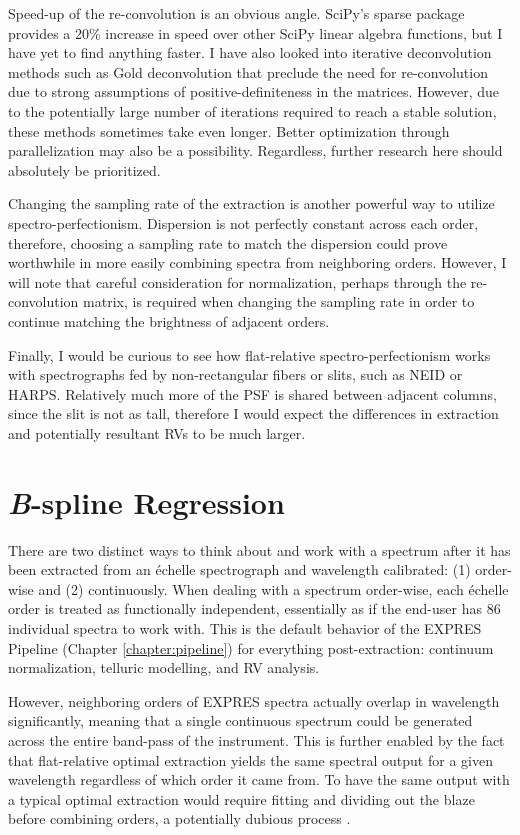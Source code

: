 Speed-up of the re-convolution is an obvious angle. SciPy's sparse package provides a 20\% increase in speed over other SciPy linear algebra functions, but I have yet to find anything faster. I have also looked into iterative deconvolution methods such as Gold deconvolution \citep{morhac_efficient_2003, morhac_deconvolution_2006} that preclude the need for re-convolution due to strong assumptions of positive-definiteness in the matrices. However, due to the potentially large number of iterations required to reach a stable solution, these methods sometimes take even longer. Better optimization through parallelization may also be a possibility. Regardless, further research here should absolutely be prioritized.

Changing the sampling rate of the extraction is another powerful way to utilize spectro-perfectionism. Dispersion is not perfectly constant across each order, therefore, choosing a sampling rate to match the dispersion could prove worthwhile in more easily combining spectra from neighboring orders. However, I will note that careful consideration for normalization, perhaps through the re-convolution matrix, is required when changing the sampling rate in order to continue matching the brightness of adjacent orders.

Finally, I would be curious to see how flat-relative spectro-perfectionism works with spectrographs fed by non-rectangular fibers or slits, such as NEID or HARPS. Relatively much more of the PSF is shared between adjacent columns, since the slit is not as tall, therefore I would expect the differences in extraction and potentially resultant RVs to be much larger.

\section{\textit{B}-spline Regression} \label{pipeline2:bspline}

There are two distinct ways to think about and work with a spectrum after it has been extracted from an \'{e}chelle spectrograph and wavelength calibrated: (1) order-wise and (2) continuously. When dealing with a spectrum order-wise, each \'{e}chelle order is treated as functionally independent, essentially as if the end-user has 86 individual spectra to work with. This is the default behavior of the EXPRES Pipeline (Chapter \ref{chapter:pipeline}) for everything post-extraction: continuum normalization, telluric modelling, and RV analysis.

However, neighboring orders of EXPRES spectra actually overlap in wavelength significantly, meaning that a single continuous spectrum could be generated across the entire band-pass of the instrument. This is further enabled by the fact that flat-relative optimal extraction yields the same spectral output for a given wavelength regardless of which order it came from. To have the same output with a typical optimal extraction would require fitting and dividing out the blaze before combining orders, a potentially dubious process \citep{xu_modeling_2019}.

